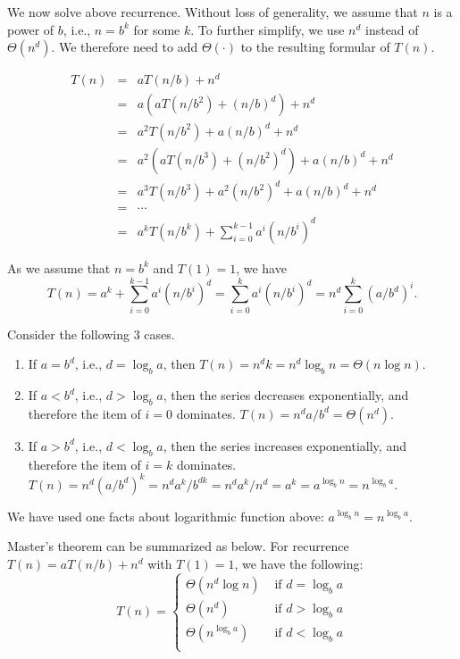 We now solve above recurrence. Without loss of generality, we assume that $n$ is a power of $b$, i.e., $n = b^k$ for some $k$.
To further simplify, we use $n^d$ instead of $\Theta(n^d)$.
We therefore need to add $\Theta(\cdot)$ to the resulting formular of $T(n)$.

\begin{eqnarray*}
T(n) & = & aT(n/b) + n^d \\
     & = & a(aT(n/b^2) + (n/b)^d) + n^d \\
	 & = & a^2 T(n/b^2) + a(n/b)^d + n^d \\
     & = & a^2(aT(n/b^3) + (n/b^2)^d) + a(n/b)^d + n^d \\
	 & = & a^3 T(n/b^3) + a^2(n/b^2)^d + a(n/b)^d + n^d \\
	 & = & \cdots \\
	 & = & a^k T(n/b^k) + \sum_{i = 0}^{k-1} a^i(n/b^i)^d
\end{eqnarray*}

As we assume that $n = b^k$ and $T(1) = 1$, we have
$$ T(n) =  a^k + \sum_{i = 0}^{k-1} a^i(n/b^i)^d = \sum_{i = 0}^{k} a^i(n/b^i)^d = n^d \sum_{i = 0}^{k} (a/b^d)^i.$$

Consider the following 3 cases. 
\vspace*{-\topsep}
\begin{enumerate}
\item If $a = b^d$, i.e., $d = \log_b a$, then $T(n) = n^d k = n^d \log_b n = \Theta(n\log n)$.
\item If $a < b^d$, i.e., $d > \log_b a$, then the series decreases exponentially, and therefore the item of $i = 0$ dominates.  $T(n) = n^d a/b^d = \Theta(n^d)$.
\item If $a > b^d$, i.e., $d < \log_b a$, then the series increases exponentially, and therefore the item of $i = k$ dominates.  
$T(n) = n^d (a/b^d)^k = n^d a^k / b^{dk} = n^d a^k/n^d = a^k = a^{\log_b n} = n^{\log_b a}$.
\end{enumerate}

We have used one facts about logarithmic function above: %
$a^{\log_b n} = n^{\log_b a}$.

Master's theorem can be summarized as below. For recurrence $T(n) = aT(n/b) + n^d$ with $T(1) = 1$, we have the following:
\begin{displaymath}
T(n) = \left\{
\begin{array}{llll}
\Theta(n^d \log n) & \textrm{ if } d = \log_b a \\
\Theta(n^d) & \textrm{ if } d > \log_b a \\
\Theta(n^{\log_b a}) & \textrm{ if } d < \log_b a \\
\end{array}
\right.
\end{displaymath}

